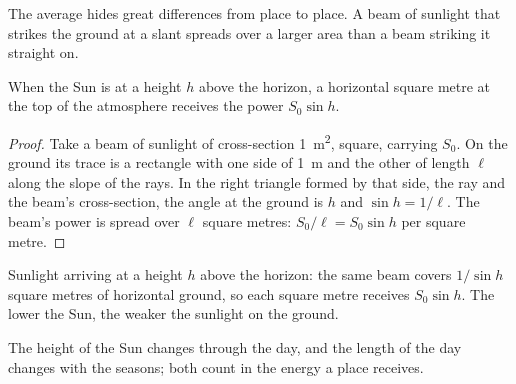 The average hides great differences from place to place. A beam of sunlight
that strikes the ground at a slant spreads over a larger area than a beam
striking it straight on.

\begin{proposition}\label{prop:g10:earth-energy-budget:height}
When the Sun is at a height $h$ above the horizon, a horizontal square metre
at the top of the atmosphere receives the power $S_0 \sin h$.
\end{proposition}

\begin{proof}
Take a beam of sunlight of cross-section \qty{1}{m^2}, square, carrying
$S_0$. On the ground its trace is a rectangle with one side of \qty{1}{m}
and the other of length $\ell$ along the slope of the rays. In the right
triangle formed by that side, the ray and the beam's cross-section, the
angle at the ground is $h$ and $\sin h = 1/\ell$. The beam's power is
spread over $\ell$ square metres: $S_0/\ell = S_0 \sin h$ per square
metre.
\end{proof}

\begin{omfigure}

{\small Sunlight arriving at a height $h$ above the horizon: the same beam
covers $1/\sin h$ square metres of horizontal ground, so each square metre
receives $S_0 \sin h$. The lower the Sun, the weaker the sunlight on the
ground.}
\end{omfigure}

The height of the Sun changes through the day, and the length of the day
changes with the seasons; both count in the energy a place receives.

